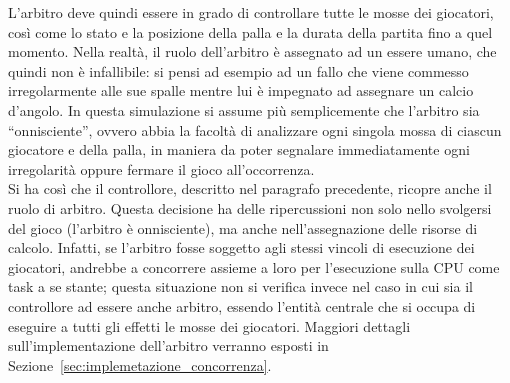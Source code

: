 L'arbitro deve quindi essere in grado di controllare tutte le mosse dei giocatori, così come lo stato e la posizione della palla e la durata della partita fino a quel momento. Nella realtà, il ruolo dell'arbitro è assegnato ad un essere umano, che quindi non è infallibile: si pensi ad esempio ad un fallo che viene commesso irregolarmente alle sue spalle mentre lui è impegnato ad assegnare un calcio d'angolo. In questa simulazione si assume più semplicemente che l'arbitro sia ``onnisciente'', ovvero abbia la facoltà di analizzare ogni singola mossa di ciascun giocatore e della palla, in maniera da poter segnalare immediatamente ogni irregolarità oppure fermare il gioco all'occorrenza.\\

Si ha così che il controllore, descritto nel paragrafo precedente, ricopre anche il ruolo di arbitro. Questa decisione ha delle ripercussioni non solo nello svolgersi del gioco (l'arbitro è onnisciente), ma anche nell'assegnazione delle risorse di calcolo. Infatti, se l'arbitro fosse soggetto agli stessi vincoli di esecuzione dei giocatori, andrebbe a concorrere assieme a loro per l'esecuzione sulla CPU come task a se stante; questa situazione non si verifica invece nel caso in cui sia il controllore ad essere anche arbitro, essendo l'entità centrale che si occupa di eseguire a tutti gli effetti le mosse dei giocatori. Maggiori dettagli sull'implementazione dell'arbitro verranno esposti in Sezione~\ref{sec:implemetazione_concorrenza}.\\

